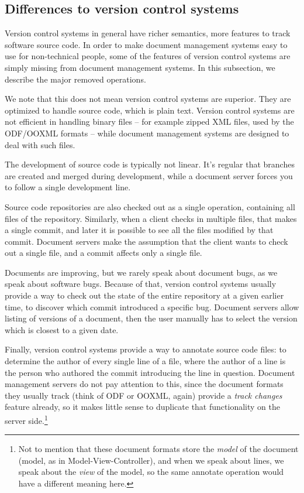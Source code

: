 \subsection{Differences to version control systems}

Version control systems in general have richer semantics, more features to
track software source code. In order to make document management systems easy
to use for non-technical people, some of the features of version control
systems are simply missing from document management systems. In this
subsection, we describe the major removed operations.

We note that this does not mean version control systems are superior. They are
optimized to handle source code, which is plain text. Version control systems
are not efficient in handling binary files -- for example zipped XML files, used by
the ODF/OOXML formats -- while document management systems are designed to deal
with such files.

The development of source code is typically not linear. It's regular that
branches are created and merged during development, while a document server
forces you to follow a single development line.

Source code repositories are also checked out as a single operation,
containing all files of the repository. Similarly, when a client checks in
multiple files, that makes a single commit, and later it is possible to see all
the files modified by that commit. Document servers make the assumption that
the client wants to check out a single file, and a commit affects only a single
file.

Documents are improving, but we rarely speak about document bugs, as we speak
about software bugs. Because of that, version control systems usually provide a
way to check out the state of the entire repository at a given earlier
time, to discover which commit introduced a specific bug. Document servers
allow listing of versions of a document, then the user manually has to select
the version which is closest to a given date.

Finally, version control systems provide a way to annotate source code files:
to determine the author of every single line of a file, where the author of a
line is the person who authored the commit introducing the line in question.
Document management servers do not pay attention to this, since the document
formats they usually track (think of ODF or OOXML, again) provide a \emph{track
changes} feature already, so it makes little sense to duplicate that
functionality on the server side.\footnote{Not to mention that these document
formats store the \emph{model} of the document (model, as in
Model-View-Controller), and when we speak about lines, we speak about the
\emph{view} of the model, so the same annotate operation would have a different
meaning here.}

